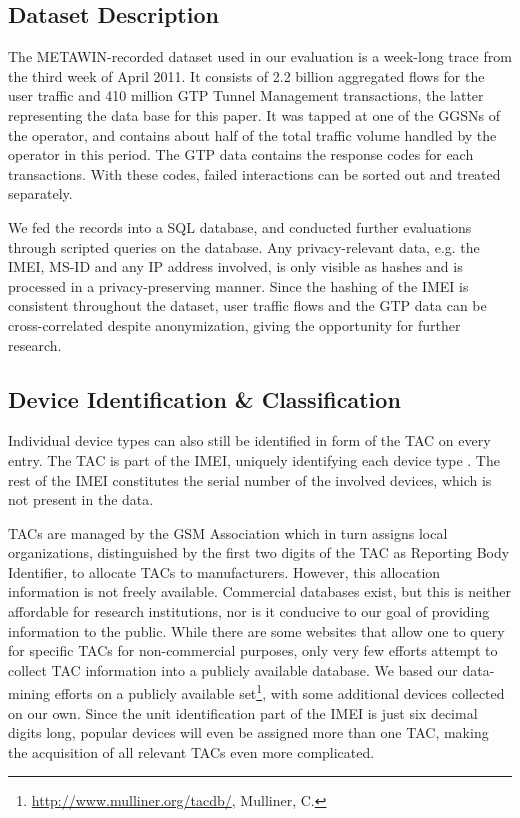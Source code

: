 \subsection{Dataset Description}


The \ac{METAWIN}-recorded dataset used in our evaluation is a week-long trace from the third week of April 2011. It consists of 2.2 billion aggregated flows for the user traffic and 410 million \ac{GTP} Tunnel Management transactions, the latter representing the data base for this paper. It was tapped at one of the \acp{GGSN} of the operator, and contains about half of the total traffic volume handled by the operator in this period. The \ac{GTP} data contains the response codes for each transactions. With these codes, failed interactions can be sorted out and treated separately.

We fed the records into a SQL database, and conducted further evaluations through scripted queries on the database. Any privacy-relevant data, e.g. the \ac{IMEI}, \ac{MS-ID} and any IP address involved, is only visible as hashes and is processed in a privacy-preserving manner.  Since the hashing of the \ac{IMEI} is consistent throughout the dataset, user traffic flows and the \ac{GTP} data can be cross-correlated despite anonymization, giving the opportunity for further research.


\subsection{Device Identification \& Classification}

Individual device types can also still be identified in form of the \ac{TAC} on every entry. The \ac{TAC} is part of the \ac{IMEI}, uniquely identifying each device type \cite{3gpp23.003}. The rest of the \ac{IMEI} constitutes the serial number of the involved devices, which is not present in the data.

\acp{TAC} are managed by the GSM Association which in turn assigns local organizations, distinguished by the first two digits of the \ac{TAC} as Reporting Body Identifier, to allocate \acp{TAC} to manufacturers. However, this allocation information is not freely available. Commercial databases exist, but this is neither affordable for research institutions, nor is it conducive to our goal of providing information to the public. While there are some websites that allow one to query for specific \acp{TAC} for non-commercial purposes, only very few efforts attempt to collect \ac{TAC} information into a publicly available database. We based our data-mining efforts on a publicly available set\footnote{\url{http://www.mulliner.org/tacdb/}, Mulliner, C.}, with some additional devices collected on our own. Since the unit identification part of the \ac{IMEI} is just six decimal digits long, popular devices will even be assigned more than one TAC, making the acquisition of all relevant \acp{TAC} even more complicated.

